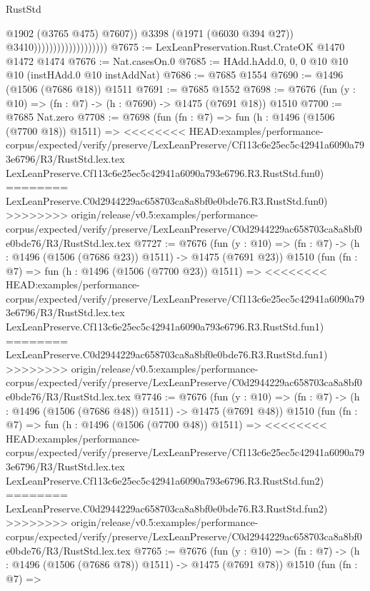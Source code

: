 \begin{lexlean}{RustStd}
\begin{coremodule}
{\begin{coremodule}
{{{{{{{{{{{{{                                              @1902
                                              (@3765 @475)
                                              @7607))
                                          @3398
                                          (@1971 (@6030 @394 @27))
                                          @3410)))))))))))))))))))
@7675 := LexLeanPreservation.Rust.CrateOK @1470 @1472 @1474
@7676 := Nat.casesOn.{0}
@7685 := HAdd.hAdd.{0, 0, 0} @10 @10 @10 (instHAdd.{0} @10 instAddNat)
@7686 := @7685 @1554
@7690 := @1496 (@1506 (@7686 @18)) @1511
@7691 := @7685 @1552
@7698 := @7676 (fun (y : @10) => (fn : @7) -> (h : @7690) -> @1475 (@7691 @18)) @1510
@7700 := @7685 Nat.zero
@7708 := @7698
    (fun (fn : @7) =>
    fun (h : @1496 (@1506 (@7700 @18)) @1511) =>
<<<<<<<< HEAD:examples/performance-corpus/expected/verify/preserve/LexLeanPreserve/Cf113c6e25ec5c42941a6090a793e6796/R3/RustStd.lex.tex
    LexLeanPreserve.Cf113c6e25ec5c42941a6090a793e6796.R3.RustStd.fun0)
========
    LexLeanPreserve.C0d2944229ac658703ca8a8bf0e0bde76.R3.RustStd.fun0)
>>>>>>>> origin/release/v0.5:examples/performance-corpus/expected/verify/preserve/LexLeanPreserve/C0d2944229ac658703ca8a8bf0e0bde76/R3/RustStd.lex.tex
@7727 := @7676
    (fun (y : @10) => (fn : @7) -> (h : @1496 (@1506 (@7686 @23)) @1511) -> @1475 (@7691 @23))
    @1510
    (fun (fn : @7) =>
    fun (h : @1496 (@1506 (@7700 @23)) @1511) =>
<<<<<<<< HEAD:examples/performance-corpus/expected/verify/preserve/LexLeanPreserve/Cf113c6e25ec5c42941a6090a793e6796/R3/RustStd.lex.tex
    LexLeanPreserve.Cf113c6e25ec5c42941a6090a793e6796.R3.RustStd.fun1)
========
    LexLeanPreserve.C0d2944229ac658703ca8a8bf0e0bde76.R3.RustStd.fun1)
>>>>>>>> origin/release/v0.5:examples/performance-corpus/expected/verify/preserve/LexLeanPreserve/C0d2944229ac658703ca8a8bf0e0bde76/R3/RustStd.lex.tex
@7746 := @7676
    (fun (y : @10) => (fn : @7) -> (h : @1496 (@1506 (@7686 @48)) @1511) -> @1475 (@7691 @48))
    @1510
    (fun (fn : @7) =>
    fun (h : @1496 (@1506 (@7700 @48)) @1511) =>
<<<<<<<< HEAD:examples/performance-corpus/expected/verify/preserve/LexLeanPreserve/Cf113c6e25ec5c42941a6090a793e6796/R3/RustStd.lex.tex
    LexLeanPreserve.Cf113c6e25ec5c42941a6090a793e6796.R3.RustStd.fun2)
========
    LexLeanPreserve.C0d2944229ac658703ca8a8bf0e0bde76.R3.RustStd.fun2)
>>>>>>>> origin/release/v0.5:examples/performance-corpus/expected/verify/preserve/LexLeanPreserve/C0d2944229ac658703ca8a8bf0e0bde76/R3/RustStd.lex.tex
@7765 := @7676
    (fun (y : @10) => (fn : @7) -> (h : @1496 (@1506 (@7686 @78)) @1511) -> @1475 (@7691 @78))
    @1510
    (fun (fn : @7) =>
}}}}}}}}}}}}}
\end{coremodule}}
\end{coremodule}
\end{lexlean}
